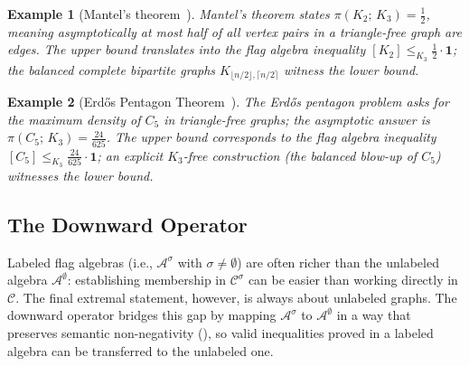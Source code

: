 \documentclass{article}
\newtheorem{example}[example]{Example}
\newcommand{\tdensity}[2]{\pi(#1;\,#2)}
\begin{document}
\begin{example}[Mantel's theorem~\cite{mantel}]\label{ex:mantel}
  Mantel's theorem states $\tdensity{K_2}{K_3} = \tfrac{1}{2}$, meaning
  asymptotically at most half of all vertex pairs in a triangle-free graph
  are edges.  The upper bound translates into the flag algebra inequality
  $[K_2] \leq_{K_3} \tfrac{1}{2}\cdot\mathbf{1}$; the balanced complete bipartite
  graphs $K_{\lfloor n/2\rfloor,\lceil n/2\rceil}$ witness the lower bound.
\end{example}

\begin{example}[Erd\H{o}s Pentagon Theorem~{\cite{grzesik2012,hatami2012}}]\label{ex:pentagon}
  The Erd\H{o}s pentagon problem asks for the maximum density of $C_5$ in
  triangle-free graphs; the asymptotic answer is $\tdensity{C_5}{K_3} = \tfrac{24}{625}$.  The upper bound corresponds to the flag algebra inequality
  $[C_5] \leq_{K_3} \tfrac{24}{625}\cdot\mathbf{1}$; an explicit \(K_3\)-free construction
  (the balanced blow-up of $C_5$) witnesses the lower bound.
\end{example}


\subsection{The Downward Operator}
\label{sec:background-downward}
Labeled flag algebras (i.e., $\mathcal{A}^\sigma$ with $\sigma \neq \emptyset$) are often
richer than the unlabeled algebra $\mathcal{A}^\emptyset$: establishing membership
in $\mathcal{C}^\sigma$ can be easier than working directly in $\mathcal{C}$.
The final extremal statement, however, is always about unlabeled graphs.
The downward operator bridges this gap by mapping $\mathcal{A}^\sigma$ to
$\mathcal{A}^\emptyset$ in a way that preserves semantic non-negativity
(), so valid inequalities proved in a labeled algebra
can be transferred to the unlabeled one.
\end{document}
